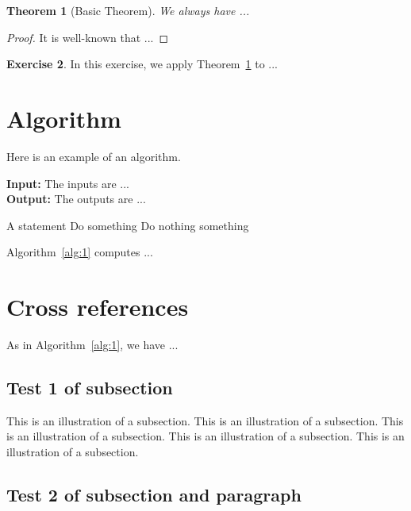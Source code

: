 \documentclass[a4paper]{article}
\newtheorem{theorem}{Theorem}[section]
\theoremstyle{definition}
\newtheorem{exercise}[theorem]{Exercise}
\theoremstyle{remark}
\numberwithin{equation}{section}
\begin{document}
\begin{theorem}[Basic Theorem]\label{thrm:1}
We always have ...
\end{theorem}

\begin{proof}
It is well-known that ...
\end{proof}

\begin{exercise}
In this exercise, we apply Theorem~\ref{thrm:1} to ...
\end{exercise}

\section{Algorithm}

Here is an example of an algorithm.

\begin{algorithm}[!ht]
\caption{An example algorithm}
\label{alg:1}
\begin{flushleft}
\textbf{Input:} The inputs are ...\\
\textbf{Output:} The outputs are ...
\end{flushleft}
\begin{algorithmic}[1]
\State A statement
	\State Do something
\Else
	\State Do nothing
\EndIf
\State \Return something
\end{algorithmic}
\end{algorithm}

Algorithm~\ref{alg:1} computes ...

\section{Cross references}

As in Algorithm~\ref{alg:1}, we have ...

\subsection{Test 1 of subsection}

This is an illustration of a subsection.
This is an illustration of a subsection.
This is an illustration of a subsection.
This is an illustration of a subsection.
This is an illustration of a subsection.

\subsection{Test 2 of subsection and paragraph}
\end{document}
